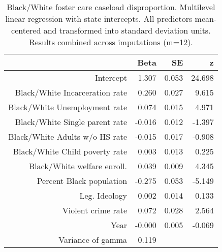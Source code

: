 \begin{table}[ht]
\centering
\caption{Black/White foster care caseload disproportion. Multilevel linear regression with state intercepts. 
             All predictors mean-centered and transformed into standard deviation units.
             Results combined across imputations (m=12).} 
\label{b.d.tab}
\begin{tabular}{rrrr}
  \hline
 & Beta & SE & z \\ 
  \hline
Intercept & 1.307 & 0.053 & 24.698 \\ 
  Black/White Incarceration rate & 0.260 & 0.027 & 9.615 \\ 
  Black/White Unemployment rate & 0.074 & 0.015 & 4.971 \\ 
  Black/White Single parent rate & -0.016 & 0.012 & -1.397 \\ 
  Black/White Adults w/o HS rate & -0.015 & 0.017 & -0.908 \\ 
  Black/White Child poverty rate & 0.003 & 0.013 & 0.225 \\ 
  Black/White welfare enroll.  & 0.039 & 0.009 & 4.345 \\ 
  Percent Black population & -0.275 & 0.053 & -5.149 \\ 
  Leg. Ideology & 0.002 & 0.014 & 0.133 \\ 
  Violent crime rate & 0.072 & 0.028 & 2.564 \\ 
  Year & -0.000 & 0.005 & -0.069 \\ 
  Variance of gamma & 0.119 &  &  \\ 
   \hline
\end{tabular}
\end{table}
